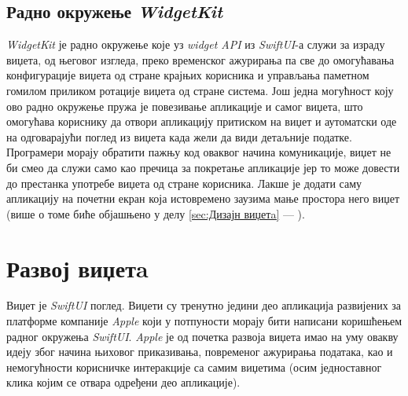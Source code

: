 \documentclass[12pt,oneside]{memoir}
\begin{document}
\subsection{Радно окружење \textit{WidgetKit}}
\indent \textit{WidgetKit} је радно окружење које уз \textit{widget API} из  \textit{SwiftUI}-а служи за израду виџета, од његовог изгледа, преко временског ажурирања па све до омогућавања конфигурације виџета од стране крајњих корисника и управљања паметном гомилом приликом ротације виџета од стране система. Још једна могућност коју ово радно окружење пружа је повезивање апликације и самог виџета, што омогућава кориснику да отвори апликацију притиском на виџет и аутоматски оде на одговарајући поглед из виџета када жели да види детаљније податке. Програмери морају обратити пажњу код оваквог начина комуникације, виџет не би смео да служи само као пречица за покретање апликације јер то може довести до престанка употребе виџета од стране корисника. Лакше је додати саму апликацију на почетни екран која истовремено заузима мање простора него виџет (више о томе биће објашњено у делу \ref{sec:Дизајн виџетa} --- ).

\section{Развој виџетa}
\label{sec:Развој виџетa}
\indent Виџет је \textit{SwiftUI} поглед. Виџети су тренутно једини део апликација развијених за платформе компаније \textit{Apple} који у потпуности морају бити написани коришћењем радног окружења \textit{SwiftUI}. \textit{Apple} је од почетка развоја виџета имао на уму овакву идеју због начина њиховог приказивања, повременог ажурирања података, као и немогућности корисничке интеракције са самим виџетима (осим једноставног клика којим се отвара одређени део апликације).
\end{document}
